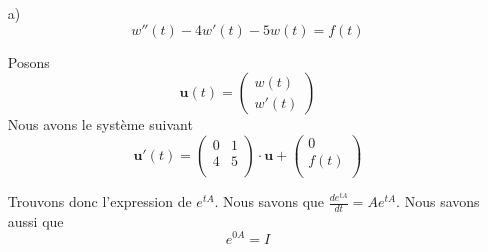 \documentclass[fontsize=12pt]{article}
\begin{document}
\begin{enumerate}
  \item[a)]
    \begin{equation}
      w''(t)-4w'(t)-5w(t)=f(t)
    \end{equation}

    Posons
    \begin{equation}
      \bm{u}(t) = \left(
        \begin{matrix}
          w(t)\\w'(t)
        \end{matrix}
      \right)
    \end{equation}
    Nous avons le système suivant
    \begin{equation}
      \bm{u}'(t) = \left(
        \begin{matrix}
          0&1 \\
          4&5 \\
        \end{matrix}
      \right) \cdot \bm{u}+\left(
        \begin{matrix}
          0 \\
          f(t) \\
        \end{matrix}
      \right)
    \end{equation}

    Trouvons donc l'expression de $e^{tA}$. Nous savons que $\frac{de^{tA}}{dt} = Ae^{tA}$. Nous savons aussi que
    \begin{equation}
      e^{0A} = I
    \end{equation}


\end{enumerate}
\end{document}
